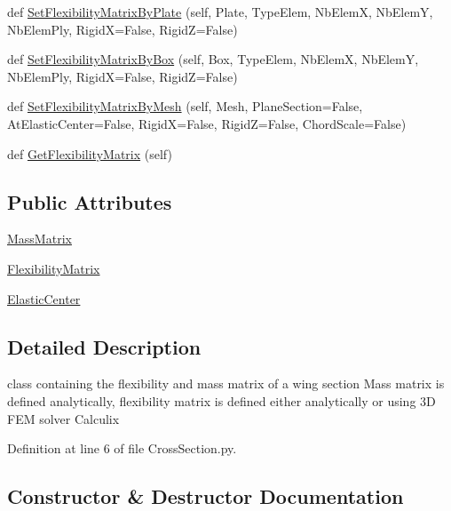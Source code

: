 \begin{DoxyCompactItemize}
def \hyperlink{classgebtaero_1_1_cross_section_1_1_cross_section_a1f7fe7afe016bebd24eb42a7199df862}{Set\+Flexibility\+Matrix\+By\+Plate} (self, Plate, Type\+Elem, Nb\+ElemX, Nb\+ElemY, Nb\+Elem\+Ply, RigidX=False, RigidZ=False)
\item 
def \hyperlink{classgebtaero_1_1_cross_section_1_1_cross_section_a1dc9bde378c556e404c167dfaeda0806}{Set\+Flexibility\+Matrix\+By\+Box} (self, Box, Type\+Elem, Nb\+ElemX, Nb\+ElemY, Nb\+Elem\+Ply, RigidX=False, RigidZ=False)
\item 
def \hyperlink{classgebtaero_1_1_cross_section_1_1_cross_section_a70eb1851ddf4a3f88fb14cfc827e0c83}{Set\+Flexibility\+Matrix\+By\+Mesh} (self, Mesh, Plane\+Section=False, At\+Elastic\+Center=False, RigidX=False, RigidZ=False, Chord\+Scale=False)
\item 
def \hyperlink{classgebtaero_1_1_cross_section_1_1_cross_section_ac06cec90003112b1de53b100c0085842}{Get\+Flexibility\+Matrix} (self)
\end{DoxyCompactItemize}
\subsection*{Public Attributes}
\begin{DoxyCompactItemize}
\item 
\hyperlink{classgebtaero_1_1_cross_section_1_1_cross_section_ae9be8649853163b2b4dfdaa3584d9f78}{Mass\+Matrix}
\item 
\hyperlink{classgebtaero_1_1_cross_section_1_1_cross_section_ac20eafaf38ff757f9a8c9ae89212396a}{Flexibility\+Matrix}
\item 
\hyperlink{classgebtaero_1_1_cross_section_1_1_cross_section_a1eb436d0de5edf2c25612bbc15d88d91}{Elastic\+Center}
\end{DoxyCompactItemize}


\subsection{Detailed Description}
\begin{DoxyVerb}class containing the flexibility and mass matrix of a wing section
Mass matrix is defined analytically, flexibility matrix is defined either analytically 
or using 3D FEM solver Calculix
\end{DoxyVerb}
 

Definition at line 6 of file Cross\+Section.\+py.



\subsection{Constructor \& Destructor Documentation}
\mbox{\label{classgebtaero_1_1_cross_section_1_1_cross_section_a26142f8a77b098b8725d7d024cfd5199}} 
